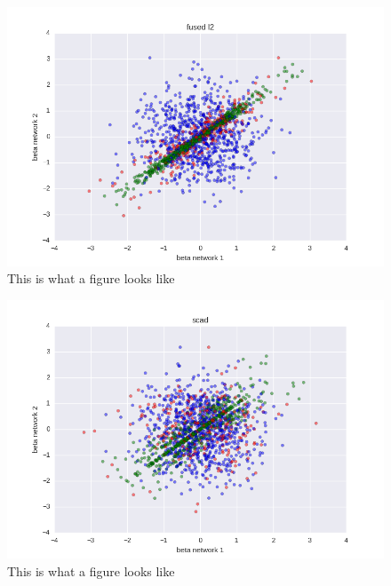 \documentclass[11pt]{article}
\begin{document}
\begin{figure}
\begin{center}
  \includegraphics[scale=0.45]{plot_betas_scad_l2.png}
  \caption{\label{fig:figure1} This is what a figure looks like}
  \end{center}
\end{figure}

\begin{figure}
\begin{center}
  \includegraphics[scale=0.45]{plot_betas_scad.png}
  \caption{\label{fig:figure1} This is what a figure looks like}
  \end{center}
\end{figure}
\end{document}
